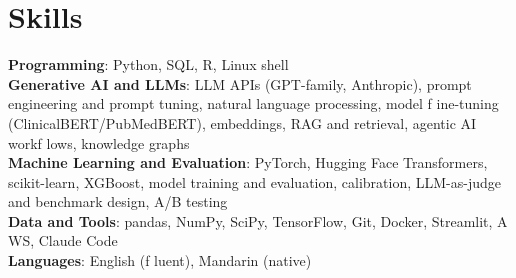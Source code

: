 \documentclass[letterpaper,11pt]{article}
\begin{document}
\section{\textbf{Skills}}
 \begin{itemize}[leftmargin=0.15in, label={}]
    \small{\item{
     \textbf{Programming}{: Python, SQL, R, Linux shell} \\
     \textbf{Generative AI and LLMs}{: LLM APIs (GPT-family, Anthropic), prompt engineering and prompt tuning, natural language processing, model f\kern0pt ine-tuning (ClinicalBERT/PubMedBERT), embeddings, RAG and retrieval, agentic AI workf\kern0pt lows, knowledge graphs} \\
     \textbf{Machine Learning and Evaluation}{: PyTorch, Hugging Face Transformers, scikit-learn, XGBoost, model training and evaluation, calibration, LLM-as-judge and benchmark design, A/B testing} \\
     \textbf{Data and Tools}{: pandas, NumPy, SciPy, TensorFlow, Git, Docker, Streamlit, A\kern0pt WS, Claude Code} \\
     \textbf{Languages}{: English (f\kern0pt luent), Mandarin (native)}}}

 \end{itemize}
\end{document}
